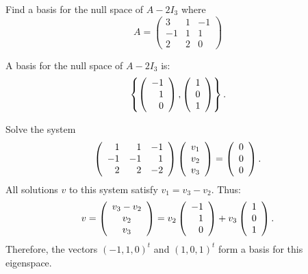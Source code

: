 \documentclass{ximera}
\begin{document}
\begin{exercise} \label{c10.2.2}
Find a basis for the null space of $A-2I_3$ where  
\[
A = \left(\begin{array}{rrr} 3 & 1 & -1 \\ -1 & 1 & 1 \\ 2 & 2 & 0 
\end{array}\right)
\]

\begin{solution}

\ans A basis for the null space of $A-2I_3$ is:
\[
\left\{\left(\begin{array}{r} -1 \\ 1 \\ 0\end{array}\right), \left(\begin{array}{r} 1 \\ 0 \\ 1\end{array}\right)\right\}.
\]

\soln Solve the system
\[
\left(\begin{array}{rrr} 1 & 1 & -1 \\ -1 & -1 & 1 \\ 2 & 2 & -2\end{array}\right)\left(\begin{array}{r} v_1 \\ v_2 \\ v_3\end{array}\right) =
\left(\begin{array}{r} 0 \\ 0 \\ 0\end{array}\right).
\]
All solutions $v$ to this system satisfy $v_1 = v_3 - v_2$.  Thus:
\[
v = \left(\begin{array}{c} v_3 - v_2 \\ v_2 \\ v_3\end{array}\right) = v_2\left(\begin{array}{r} -1 \\ 1 \\ 0\end{array}\right) +
v_3\left(\begin{array}{r} 1 \\ 0 \\ 1\end{array}\right).
\]
Therefore, the vectors $(-1,1,0)^t$ and $(1,0,1)^t$ form a basis
for this eigenspace.

\end{solution}
\end{exercise}
\end{document}
